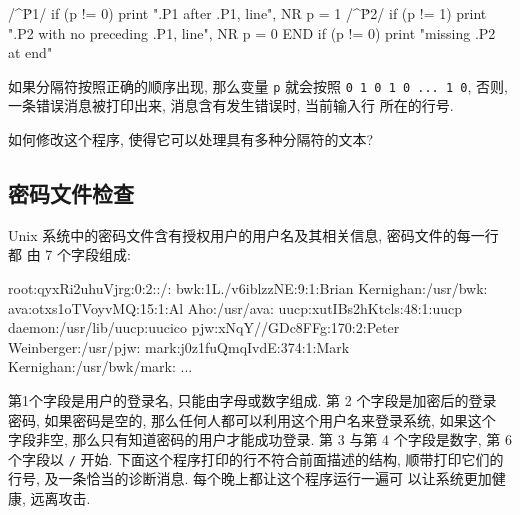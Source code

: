 \begin{shell}
\begin{awkcode}
    /^\.P1/ { if (p != 0)
                  print ".P1 after .P1, line", NR
              p = 1
            }
    /^\.P2/ { if (p != 1)
                  print ".P2 with no preceding .P1, line", NR
              p = 0
            }
    END     { if (p != 0) print "missing .P2 at end" }
\end{awkcode}
如果分隔符按照正确的顺序出现, 那么变量 \verb'p' 就会按照 \texttt{0 1 0 1 0
... 1 0}, 否则, 一条错误消息被打印出来, 消息含有发生错误时, 当前输入行
所在的行号.

\begin{exercise}
    如何修改这个程序, 使得它可以处理具有多种分隔符的文本?
\end{exercise}

\subsection{密码文件检查}
\label{subsec:password_file checking}

Unix 系统中的密码文件含有授权用户的用户名及其相关信息, 密码文件的每一行都
由 7 个字段组成:
\begin{awkcode}
    root:qyxRi2uhuVjrg:0:2::/:
    bwk:1L./v6iblzzNE:9:1:Brian Kernighan:/usr/bwk:
    ava:otxs1oTVoyvMQ:15:1:Al Aho:/usr/ava:
    uucp:xutIBs2hKtcls:48:1:uucp daemon:/usr/lib/uucp:uucico
    pjw:xNqY//GDc8FFg:170:2:Peter Weinberger:/usr/pjw:
    mark:j0z1fuQmqIvdE:374:1:Mark Kernighan:/usr/bwk/mark:
    ...
\end{awkcode}
第1个字段是用户的登录名, 只能由字母或数字组成. 第 2 个字段是加密后的登录
密码, 如果密码是空的, 那么任何人都可以利用这个用户名来登录系统, 如果这个
字段非空, 那么只有知道密码的用户才能成功登录. 第 3 与第 4 个字段是数字,
第 6 个字段以 \verb'/' 开始. 下面这个程序打印的行不符合前面描述的结构,
顺带打印它们的行号, 及一条恰当的诊断消息. 每个晚上都让这个程序运行一遍可
以让系统更加健康, 远离攻击.


\end{shell}
